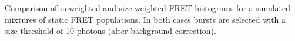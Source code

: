 \label{fig:weight_fret_sim} Comparison of unweighted and size-weighted FRET histograms for a simulated mixtures of static FRET populations. In both cases bursts are selected with a size threshold of 10 photons (after background correction).